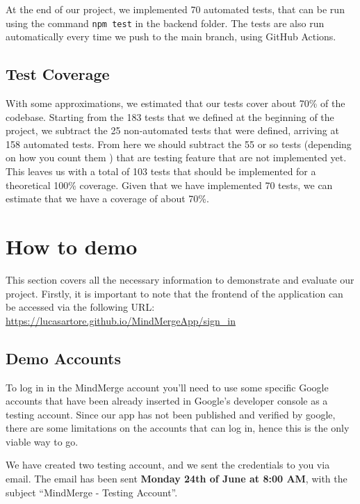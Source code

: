 \documentclass{article}
\begin{document}
At the end of our project, we implemented 70 automated tests, that can be run using the command \texttt{npm test}
in the backend folder.
\newline
The tests are also run automatically every time we push to the main branch, using GitHub Actions.

\subsection{Test Coverage}

With some approximations, we estimated that our tests cover about 70\% of the codebase.
\newline
Starting from the 183 tests that we defined at the beginning of the project, we subtract the 25 non-automated
tests that were defined, arriving at 158 automated tests.
\newline
From here we should subtract the 55 or so tests (depending on how you count them ) that
are testing feature that are not implemented yet. This leaves us with a total of 103 tests that should be implemented 
for a theoretical 100\% coverage.
\newline
Given that we have implemented 70 tests, we can estimate that we have a coverage of about 70\%.

\section{How to demo}
This section covers all the necessary information to demonstrate and evaluate our project. Firstly, it is important to note that the frontend of the application can be accessed via the following URL: \url{https://lucasartore.github.io/MindMergeApp/sign_in}
\subsection{Demo Accounts}

To log in in the MindMerge account you'll need to use some specific Google accounts that have been already inserted in Google's developer console as a testing account.
Since our app has not been published and verified by google, there are some limitations on the accounts that can log in, hence this is the only viable way to go.

We have created two testing account, and we sent the credentials to you via email.
The email has been sent \textbf{Monday 24th of June at 8:00 AM}, with the subject ``MindMerge - Testing Account''.
\end{document}
